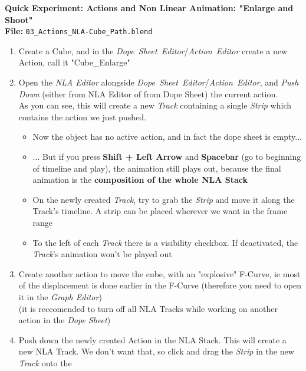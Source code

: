 \documentclass{article}
\begin{document}
\begin{mdframed}[linewidth=2pt, linecolor=gray, roundcorner=1pt, innermargin=2pt, outermargin=2pt]
    \textbf{\Large Quick Experiment: Actions and Non Linear Animation: "Enlarge and Shoot"} \\[6pt]
    \textbf{File:} \texttt{03\_Actions\_NLA-Cube\_Path.blend} \\[6pt]

    \begin{enumerate}[topsep=0pt, noitemsep]
        \item Create a Cube, and in the \mbox{\textit{Dope Sheet Editor}/\textit{Action Editor}} create a new Action, call it \mbox{"Cube\_Enlarge"}
        \item Open the \textit{NLA Editor} alongside \mbox{\textit{Dope Sheet Editor}/\textit{Action Editor}}, and \textit{Push Down} (either from NLA Editor of from Dope Sheet) the current action.\\
        As you can see, this will create a new \textit{Track} containing a single \textit{Strip} which contains the action we just pushed.
        \begin{itemize}[noitemsep, topsep=0pt]
            \item Now the object has no active action, and in fact the dope sheet is empty...
            \item ... But if you press \textbf{Shift + Left Arrow} and \textbf{Spacebar} (go to beginning of timeline and play), the animation still plays out, because the final animation is the 
              \textbf{composition of the whole NLA Stack}
            \item On the newly created \textit{Track}, try to grab the \textit{Strip} and move it along the Track's timeline. A strip can be placed wherever we want in the frame range
            \item To the left of each \textit{Track} there is a visibility checkbox. If deactivated, the \textit{Track}'s animation won't be played out
        \end{itemize}
        \item Create another action to move the cube, with an "explosive" F-Curve, ie most of the displacement is done earlier in the F-Curve (therefore you need to open it in the \textit{Graph Editor})\\
          (it is reccomended to turn off all NLA Tracks while working on another action in the \textit{Dope Sheet})
        \item Push down the newly created Action in the NLA Stack. This will create a new NLA Track. We don't want that, so click and drag the \textit{Strip} in the new \textit{Track} onto the 

\end{enumerate}
\end{mdframed}
\end{document}
